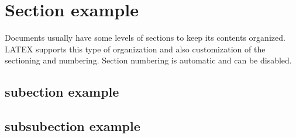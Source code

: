\section{Section example}\label{sec:Section example}

Documents usually have some levels of sections to keep its contents organized. LATEX supports this type of organization and also customization of the sectioning and numbering. Section numbering is automatic and can be disabled. 

\subsection{subection example}

\subsection{subsubection example}
